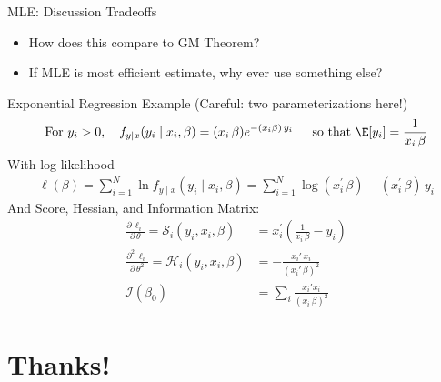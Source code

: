 \documentclass[aspectratio=169,11pt]{beamer}
\begin{document}
\begin{frame}{MLE: Discussion}
Tradeoffs
\begin{itemize}
\item How does this compare to GM Theorem?
\item If MLE is most efficient estimate, why ever use something else?
\end{itemize}
\end{frame}


\begin{frame}{Exponential Regression Example (Careful: two parameterizations here!)}
\begin{align*}
\text{For } y_i > 0, \quad f _ { y \mid x} ( y_i \mid x_i , \beta  ) =  (x_i \, \beta)e^{ - (x_i \beta )\, y_i }\, \quad  \text{ so that } \E[y_i] = \frac{1}{x_i\, \beta}
\end{align*}
With log likelihood
\begin{align*}
\ell( \beta ) = \sum _ { i = 1 } ^ { N } \ln f _ { y \mid x } \left( y _ { i } \mid x _ { i } , \beta \right) = \sum _ { i = 1 } ^ { N } \log(x _ { i } ^ { \prime }\, \beta) - \left( x _ { i } ^ { \prime }\, \beta \right)\, y _ { i } 
\end{align*}
And Score, Hessian, and Information Matrix:
\begin{align*}
\frac{\partial\, \ell_i}{\partial\, \theta} = \mathcal { S }_i ( y_i, x_i , \beta ) &=  x_i ^ { \prime } \left( \frac{1}{x_i\, \beta} - y_i \right)\\
\frac{\partial^2\, \ell_i}{\partial\, \theta^2} = \mathcal { H }_i ( y_i , x_i , \beta ) &= - \frac{x_i'\, x_i}{(x_i'\, \beta)^2}\\
\mathcal { I } \left( \beta _ { 0 } \right) &= \sum_i \frac{x_i' x_i}{(x_i\, \beta)^2}
\end{align*}
\end{frame}



\section*{Thanks!}
\end{document}
